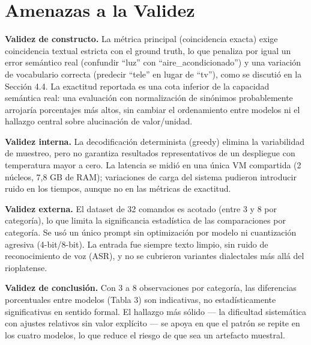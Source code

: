 \section{Amenazas a la Validez}

\textbf{Validez de constructo.} La métrica principal (coincidencia exacta)
exige coincidencia textual estricta con el ground truth, lo que penaliza
por igual un error semántico real (confundir ``luz'' con
``aire\_acondicionado'') y una variación de vocabulario correcta (predecir
``tele'' en lugar de ``tv''), como se discutió en la Sección 4.4. La
exactitud reportada es una cota inferior de la capacidad semántica real:
una evaluación con normalización de sinónimos probablemente arrojaría
porcentajes más altos, sin cambiar el ordenamiento entre modelos ni el
hallazgo central sobre alucinación de valor/unidad.

\textbf{Validez interna.} La decodificación determinista (greedy) elimina
la variabilidad de muestreo, pero no garantiza resultados representativos
de un despliegue con temperatura mayor a cero. La latencia se midió en una
única VM compartida (2 núcleos, 7,8 GB de RAM); variaciones de carga del
sistema pudieron introducir ruido en los tiempos, aunque no en las métricas
de exactitud.

\textbf{Validez externa.} El dataset de 32 comandos es acotado (entre 3 y 8
por categoría), lo que limita la significancia estadística de las
comparaciones por categoría. Se usó un único prompt sin optimización por
modelo ni cuantización agresiva (4-bit/8-bit). La entrada fue siempre texto
limpio, sin ruido de reconocimiento de voz (ASR), y no se cubrieron
variantes dialectales más allá del rioplatense.

\textbf{Validez de conclusión.} Con 3 a 8 observaciones por categoría, las
diferencias porcentuales entre modelos (Tabla 3) son indicativas, no
estadísticamente significativas en sentido formal. El hallazgo más sólido —
la dificultad sistemática con ajustes relativos sin valor explícito — se
apoya en que el patrón se repite en los cuatro modelos, lo que reduce el
riesgo de que sea un artefacto muestral.
